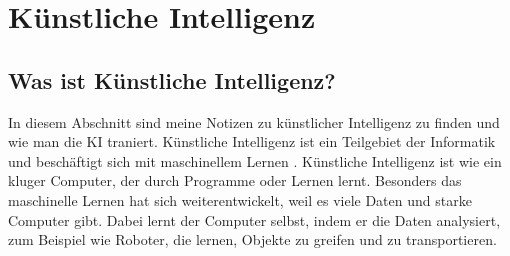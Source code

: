 \section{Künstliche Intelligenz}
\label{sec:ai}
\subsection{Was ist Künstliche Intelligenz?}

In diesem Abschnitt sind meine Notizen zu künstlicher Intelligenz zu finden und wie man die KI traniert.
\newline
Künstliche Intelligenz ist ein Teilgebiet der Informatik und beschäftigt sich mit maschinellem Lernen \citep{ai-wikipedia}.
\newline
Künstliche Intelligenz ist wie ein kluger Computer, der durch Programme oder Lernen lernt. Besonders das maschinelle Lernen hat sich weiterentwickelt, weil es viele Daten und starke Computer gibt. Dabei lernt der Computer selbst, indem er die Daten analysiert, zum Beispiel wie Roboter, die lernen, Objekte zu greifen und zu transportieren.